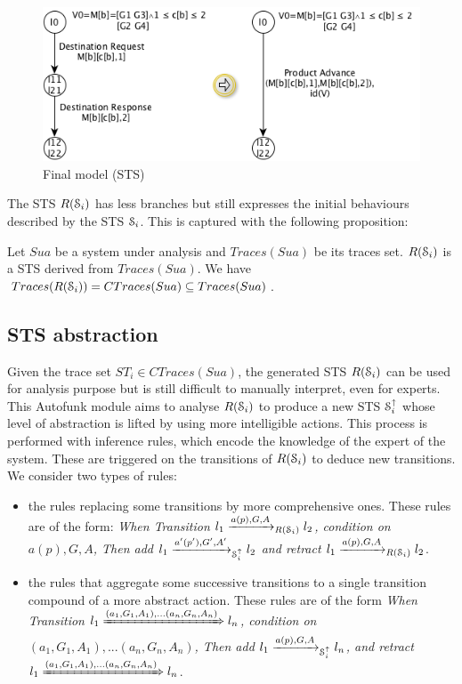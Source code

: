 \begin{figure}[ht]
  \includegraphics[width=1.0\linewidth]{figures/STSfinal.png}

	\caption{Final model (STS)}
	\label{fig:finalmodel}
\end{figure}

The STS $R(\EuScript{S}_i)$ has less branches but still expresses
the initial behaviours described by the STS $\EuScript{S}_i$.
This is captured with the following proposition:

\begin{proposition}
  Let $Sua$ be a system under analysis and $Traces(Sua)$ be its traces
  set. $R(\EuScript{S}_i)$ is a STS derived from $Traces(Sua)$.
  We have $Traces(R(\EuScript{S}_i)) = CTraces(Sua) \subseteq Traces(Sua)$.
\end{proposition}

\subsection{STS abstraction}

Given the trace set $ST_i \in CTraces(Sua)$, the generated STS
$R(\EuScript{S}_i)$ can be used for analysis purpose but is still
difficult to manually interpret, even for experts.  This Autofunk
module aims to analyse $R(\EuScript{S}_i)$ to produce a new STS
$\EuScript{S}_i^\uparrow$ whose level of abstraction is lifted by
using more intelligible actions. This process is performed with
inference rules, which encode the knowledge of the expert of the
system. These are triggered on the transitions of
$R(\EuScript{S}_i)$ to deduce new transitions. We consider two
types of rules:

\begin{itemize}
    \item the rules replacing some transitions by more
    comprehensive ones. These rules are of the form: \textit{When
    Transition $l_1 \xrightarrow{a(p),G,A}_{R(\EuScript{S}_i)}
    l_2$, condition on $a(p),G,A$, Then add $l_1
    \xrightarrow{a'(p'),G',A'}_{\EuScript{S}_i^\uparrow} l_2$ and
    retract $l_1 \xrightarrow{a(p),G,A}_{R(\EuScript{S}_i)} l_2$}.

    \item the rules that aggregate some successive transitions
    to a single transition compound of a more abstract action.
    These rules are of the form \textit{When Transition $l_1
    \xRightarrow{(a_1,G_1,A_1),...(a_n,G_n,A_n)} l_n$, condition
    on $(a_1,G_1,A_1),...(a_n,G_n,A_n)$, Then add $l_1
    \xrightarrow{a(p),G,A}_{\EuScript{S}_i^\uparrow} l_n $, and
    retract $l_1 \xRightarrow{(a_1,G_1,A_1),...(a_n,G_n,A_n)} l_n$}.
\end{itemize}

